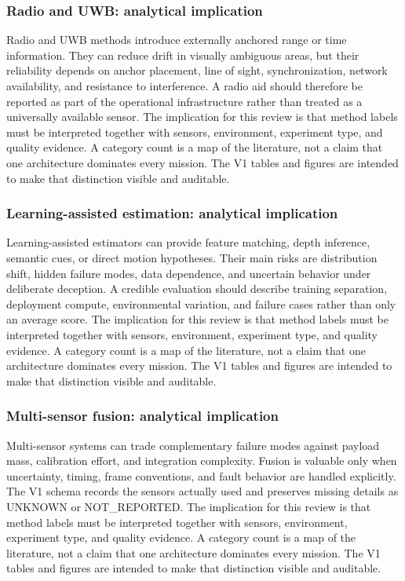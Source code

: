 \documentclass[
  journal,
  10pt]{IEEEtran}
\begin{document}
\subsubsection{Radio and UWB: analytical
implication}\label{radio-and-uwb-analytical-implication-1}

Radio and UWB methods introduce externally anchored range or time
information. They can reduce drift in visually ambiguous areas, but
their reliability depends on anchor placement, line of sight,
synchronization, network availability, and resistance to interference. A
radio aid should therefore be reported as part of the operational
infrastructure rather than treated as a universally available sensor.
The implication for this review is that method labels must be
interpreted together with sensors, environment, experiment type, and
quality evidence. A category count is a map of the literature, not a
claim that one architecture dominates every mission. The V1 tables and
figures are intended to make that distinction visible and auditable.

\subsubsection{Learning-assisted estimation: analytical
implication}\label{learning-assisted-estimation-analytical-implication-1}

Learning-assisted estimators can provide feature matching, depth
inference, semantic cues, or direct motion hypotheses. Their main risks
are distribution shift, hidden failure modes, data dependence, and
uncertain behavior under deliberate deception. A credible evaluation
should describe training separation, deployment compute, environmental
variation, and failure cases rather than only an average score. The
implication for this review is that method labels must be interpreted
together with sensors, environment, experiment type, and quality
evidence. A category count is a map of the literature, not a claim that
one architecture dominates every mission. The V1 tables and figures are
intended to make that distinction visible and auditable.

\subsubsection{Multi-sensor fusion: analytical
implication}\label{multi-sensor-fusion-analytical-implication-1}

Multi-sensor systems can trade complementary failure modes against
payload mass, calibration effort, and integration complexity. Fusion is
valuable only when uncertainty, timing, frame conventions, and fault
behavior are handled explicitly. The V1 schema records the sensors
actually used and preserves missing details as UNKNOWN or NOT\_REPORTED.
The implication for this review is that method labels must be
interpreted together with sensors, environment, experiment type, and
quality evidence. A category count is a map of the literature, not a
claim that one architecture dominates every mission. The V1 tables and
figures are intended to make that distinction visible and auditable.
\end{document}
